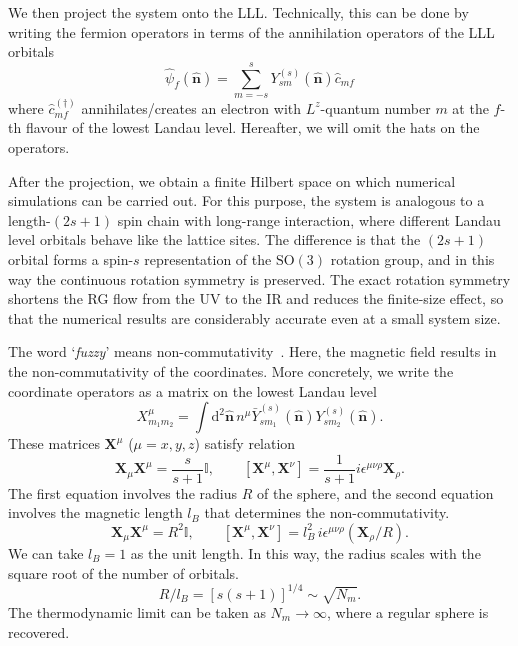 \documentclass{timesjhep}
\begin{document}
We then project the system onto the LLL. Technically, this can be done by writing the fermion operators in terms of the annihilation operators of the LLL orbitals
\begin{equation}
    \hat{\psi}_f(\hat{\mathbf{n}})=\sum_{m=-s}^s Y^{(s)}_{sm}(\hat{\mathbf{n}})\hat{c}_{mf}
\end{equation} 
where $\hat{c}^{(\dagger)}_{mf}$ annihilates/creates an electron with $L^z$-quantum number $m$ at the $f$-th flavour of the lowest Landau level. Hereafter, we will omit the hats on the operators. 

After the projection, we obtain a finite Hilbert space on which numerical simulations can be carried out. For this purpose, the system is analogous to a length-$(2s+1)$ spin chain with long-range interaction, where different Landau level orbitals behave like the lattice sites. The difference is that the $(2s+1)$ orbital forms a spin-$s$ representation of the $\mathrm{SO}(3)$ rotation group, and in this way the continuous rotation symmetry is preserved. The exact rotation symmetry shortens the RG flow from the UV to the IR and reduces the finite-size effect, so that the numerical results are considerably accurate even at a small system size. 

The word `\emph{fuzzy}' means non-commutativity~\cite{Madore1991Fuzzy}. Here, the magnetic field results in the non-commutativity of the coordinates. More concretely, we write the coordinate operators as a matrix on the lowest Landau level 
\begin{equation}
    X^\mu_{m_1m_2}=\int\mathrm{d}^2\hat{\mathbf{n}}\,n^\mu \bar{Y}_{sm_1}^{(s)}(\hat{\mathbf{n}})Y_{sm_2}^{(s)}(\hat{\mathbf{n}}).
\end{equation}
These matrices $\mathbf{X}^\mu$ ($\mu=x,y,z$) satisfy relation~\cite{Hasebe2010LLL,Zhou2023}
\begin{equation}
    \mathbf{X}_\mu\mathbf{X}^\mu=\frac{s}{s+1}\mathbb{I},\qquad [\mathbf{X}^\mu,\mathbf{X}^\nu]=\frac{1}{s+1}i\epsilon^{\mu\nu\rho}\mathbf{X}_\rho.
\end{equation}
The first equation involves the radius $R$ of the sphere, and the second equation involves the magnetic length $l_B$ that determines the non-commutativity. 
\begin{equation*}
    \mathbf{X}_\mu\mathbf{X}^\mu=R^2\mathbb{I},\qquad [\mathbf{X}^\mu,\mathbf{X}^\nu]=l_B^2\,i\epsilon^{\mu\nu\rho}(\mathbf{X}_\rho/R).
\end{equation*}
We can take $l_B=1$ as the unit length. In this way, the radius scales with the square root of the number of orbitals.
\begin{equation}
    R/l_B=[s(s+1)]^{1/4}\sim\sqrt{N_m}.
\end{equation} 
The thermodynamic limit can be taken as $N_m\to\infty$, where a regular sphere is recovered. 
\end{document}
